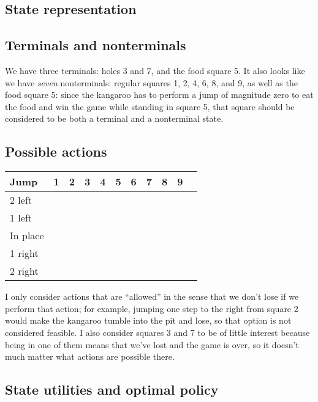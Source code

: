 \documentclass[letterpaper, 10pt]{article}
\begin{document}
\begin{multicols}{2}
\section{}
\subsection{State representation}

\subsection{Terminals and nonterminals}
We have three terminals: holes 3 and 7, and the food square 5. It also looks like we have \emph{seven} nonterminals: regular squares 1, 2, 4, 6, 8, and 9, as well as the food square 5: since the kangaroo has to perform a jump of magnitude zero to eat the food and win the game while standing in square 5, that square should be considered to be both a terminal and a nonterminal state. 

\subsection{Possible actions}
\begin{tabular}{lcccccccccc}
	Jump & 1 & 2 & 3 & 4 & 5 & 6 & 7 & 8 & 9 \\
	\midrule
	2 left   & \checkmark & \checkmark & & \checkmark & & \checkmark & & \checkmark &  \\
	1 left   & \checkmark & \checkmark & & & \checkmark & \checkmark & & & \checkmark \\
	In place & \checkmark & \checkmark & & \checkmark & \checkmark & \checkmark & & \checkmark & \checkmark \\
	1 right  & \checkmark & & & \checkmark & \checkmark & & & \checkmark & \checkmark \\
	2 right  & & \checkmark & & \checkmark & & \checkmark & & \checkmark & \checkmark \\
\end{tabular}

\vspace{10pt}

\noindent 
I only consider actions that are ``allowed'' in the sense that we don't lose if we perform that action; for example, jumping one step to the right from square 2 would make the kangaroo tumble into the pit and lose, so that option is not considered feasible. I also consider squares 3 and 7 to be of little interest because being in one of them means that we've lost and the game is over, so it doesn't much matter what actions are possible there.


\subsection{State utilities and optimal policy}

\end{multicols}
\end{document}
